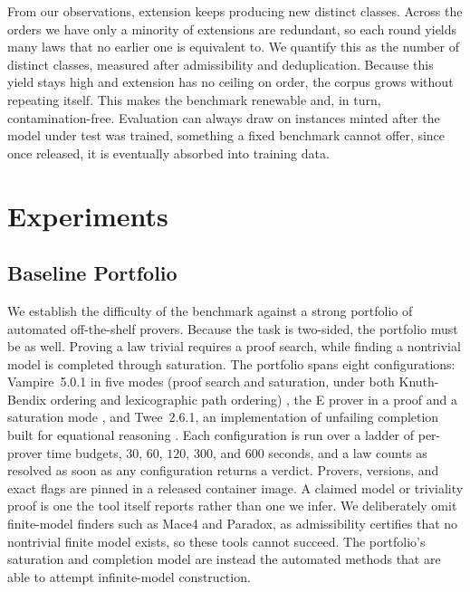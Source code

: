 \documentclass[letterpaper]{article} %
\begin{document}
From our observations, extension keeps producing new distinct classes. Across the orders we have only a minority of extensions are redundant, so each round yields many laws that no earlier one is equivalent to. We quantify this as the number of distinct classes, measured after admissibility and deduplication. Because this yield stays high and extension has no ceiling on order, the corpus grows without repeating itself. This makes the benchmark renewable and, in turn, contamination-free. Evaluation can always draw on instances minted after the model under test was trained, something a fixed benchmark cannot offer, since once released, it is eventually absorbed into training data. 







\section{Experiments}

\subsection{Baseline Portfolio}
We establish the difficulty of the benchmark against a strong portfolio of automated off-the-shelf provers. Because the task is two-sided, the portfolio must be as well. Proving a law trivial requires a proof search, while finding a nontrivial model is completed through saturation. The portfolio spans eight configurations: Vampire~5.0.1 in five modes (proof search and saturation, under both Knuth-Bendix ordering and lexicographic path ordering) \citep{...}, the E prover in a proof and a saturation mode \citep{...}, and Twee~2.6.1, an implementation of unfailing completion built for equational reasoning \citep{...}. Each configuration is run over a ladder of per-prover time budgets, $30$, $60$, $120$, $300$, and $600$ seconds, and a law counts as resolved as soon as any configuration returns a verdict. Provers, versions, and exact flags are pinned in a released container image. A claimed model or triviality proof is one the tool itself reports rather than one we infer. We deliberately omit finite-model finders such as Mace4 and Paradox, as admissibility certifies that no nontrivial finite model exists, so these tools cannot succeed. The portfolio's saturation and completion model are instead the automated methods that are able to attempt infinite-model construction. 
\end{document}
